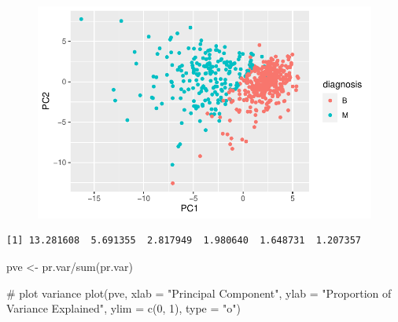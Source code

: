 \documentclass[
  letterpaper,
  DIV=11,
  numbers=noendperiod]{scrartcl}
\newenvironment{Shaded}{\begin{snugshade}}{\end{snugshade}}
\newcommand{\AttributeTok}[1]{\textcolor[rgb]{0.40,0.45,0.13}{#1}}
\newcommand{\CommentTok}[1]{\textcolor[rgb]{0.37,0.37,0.37}{#1}}
\newcommand{\DecValTok}[1]{\textcolor[rgb]{0.68,0.00,0.00}{#1}}
\newcommand{\FunctionTok}[1]{\textcolor[rgb]{0.28,0.35,0.67}{#1}}
\newcommand{\NormalTok}[1]{\textcolor[rgb]{0.00,0.23,0.31}{#1}}
\newcommand{\OtherTok}[1]{\textcolor[rgb]{0.00,0.23,0.31}{#1}}
\newcommand{\SpecialCharTok}[1]{\textcolor[rgb]{0.37,0.37,0.37}{#1}}
\newcommand{\StringTok}[1]{\textcolor[rgb]{0.13,0.47,0.30}{#1}}
\begin{document}
\begin{figure}[H]

{\centering \includegraphics{test_files/figure-pdf/unnamed-chunk-10-1.pdf}

}

\end{figure}

\begin{Shaded}
\end{Shaded}

\begin{verbatim}
[1] 13.281608  5.691355  2.817949  1.980640  1.648731  1.207357
\end{verbatim}

\begin{Shaded}
\begin{Highlighting}[]
\NormalTok{pve }\OtherTok{\textless{}{-}}\NormalTok{ pr.var}\SpecialCharTok{/}\FunctionTok{sum}\NormalTok{(pr.var)}

\CommentTok{\# plot variance}
\FunctionTok{plot}\NormalTok{(pve, }\AttributeTok{xlab =} \StringTok{"Principal Component"}\NormalTok{, }
     \AttributeTok{ylab =} \StringTok{"Proportion of Variance Explained"}\NormalTok{, }
     \AttributeTok{ylim =} \FunctionTok{c}\NormalTok{(}\DecValTok{0}\NormalTok{, }\DecValTok{1}\NormalTok{), }\AttributeTok{type =} \StringTok{"o"}\NormalTok{)}
\end{Highlighting}
\end{Shaded}
\end{document}

